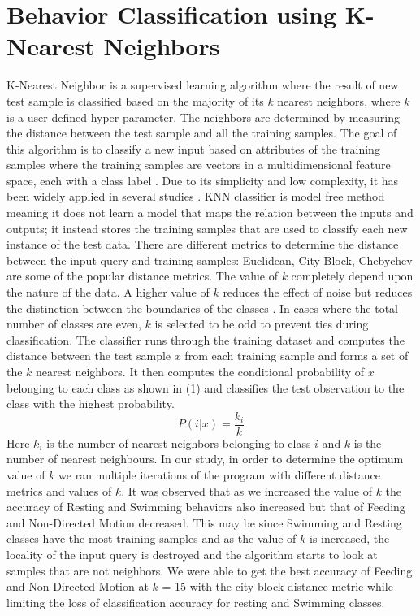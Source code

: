 \documentclass[conference]{IEEEtran}
\begin{document}
\section{Behavior Classification using K-Nearest Neighbors}
K-Nearest Neighbor is a supervised learning algorithm where the result of new test sample is classified based on the majority of its $k$ nearest neighbors, where $k$ is a user defined hyper-parameter. The neighbors are determined by measuring the distance between the test sample and all the training samples. The goal of this algorithm is to classify a new input based on attributes of the training samples where the training samples are vectors in a multidimensional feature space, each with a class label \cite{17}. Due to its simplicity and low complexity, it has been widely applied in several studies \cite{16}\cite{17}\cite{18}. KNN classifier is model free method meaning it does not learn a model that maps the relation between the inputs and outputs; it instead stores the training samples that are used to classify each new instance of the test data.\cite{19} There are different metrics to determine the distance between the input query and training samples: Euclidean, City Block, Chebychev are some of the popular distance metrics. The value of $k$ completely depend upon the nature of the data. A higher value of $k$ reduces the effect of noise but reduces the distinction between the boundaries of the classes \cite{17}. In cases where the total number of classes are even, $k$ is selected to be odd to prevent ties during classification. 
The classifier runs through the training dataset and computes the distance between the test sample $x$ from each training sample and forms a set of the $k$ nearest neighbors. It then computes the conditional probability of $x$ belonging to each class as shown in (1) and classifies the test observation to the class with the highest probability.
\begin{equation}
P(i|x) = \frac{k_i}{k}
\end{equation}
Here $k_i$ is the number of nearest neighbors belonging to class $i$ and $k$ is the number of nearest neighbours. In our study, in order to determine the optimum value of $k$ we ran multiple iterations of the program with different distance metrics and values of $k$. It was observed that as we increased the value of $k$ the accuracy of Resting and Swimming behaviors also increased but that of Feeding and Non-Directed Motion decreased. This may be since Swimming and Resting classes have the most training samples and as the value of $k$ is increased, the locality of the input query is destroyed and the algorithm starts to look at samples that are not neighbors.  We were able to get the best accuracy of Feeding and Non-Directed Motion at $k$ = 15 with the city block distance metric while limiting the loss of classification  accuracy for resting and Swimming classes.
\end{document}
